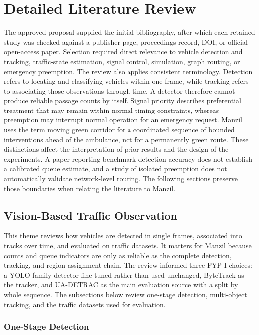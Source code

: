 \section{Detailed Literature Review}

The approved proposal supplied the initial bibliography, after which each retained study was checked against a publisher page, proceedings record, DOI, or official open-access paper. Selection required direct relevance to vehicle detection and tracking, traffic-state estimation, signal control, simulation, graph routing, or emergency preemption. The review also applies consistent terminology. Detection refers to locating and classifying vehicles within one frame, while tracking refers to associating those observations through time. A detector therefore cannot produce reliable passage counts by itself. Signal priority describes preferential treatment that may remain within normal timing constraints, whereas preemption may interrupt normal operation for an emergency request. Manzil uses the term moving green corridor for a coordinated sequence of bounded interventions ahead of the ambulance, not for a permanently green route. These distinctions affect the interpretation of prior results and the design of the experiments. A paper reporting benchmark detection accuracy does not establish a calibrated queue estimate, and a study of isolated preemption does not automatically validate network-level routing. The following sections preserve those boundaries when relating the literature to Manzil.

\subsection{Vision-Based Traffic Observation}

This theme reviews how vehicles are detected in single frames, associated into tracks over time, and evaluated on traffic datasets. It matters for Manzil because counts and queue indicators are only as reliable as the complete detection, tracking, and region-assignment chain. The review informed three FYP-I choices: a YOLO-family detector fine-tuned rather than used unchanged, ByteTrack as the tracker, and UA-DETRAC as the main evaluation source with a split by whole sequence. The subsections below review one-stage detection, multi-object tracking, and the traffic datasets used for evaluation.

\subsubsection{One-Stage Detection}

